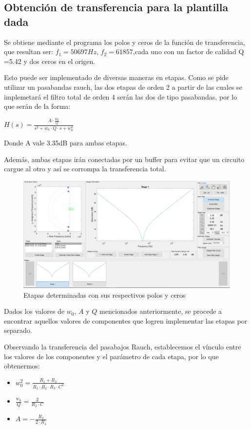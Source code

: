 \documentclass[../../tc_tp5_main.tex]{subfiles}
\begin{document}
	\subsection{Obtención de transferencia para la plantilla dada}
	
	Se obtiene mediante el programa los polos y ceros de la función de transferencia, que resultan ser: $f_1 = 50697 Hz$, $f_2 = 61857$,cada uno con un factor de calidad Q =5.42 y dos ceros en el origen.\par
	Esto puede ser implementado de diversas maneras en etapas. Como se pide utilizar un pasabandas rauch, las dos etapas de orden 2 a partir de las cuales se implemetará el filtro total de orden 4 serán las dos de tipo pasabandas, por lo que serán de la forma:
\begin{center}
$H(s) = \frac{A \cdot \frac{w_0}{Q}}{s^2 + w_0\cdot Q\cdot s + w_0^2}$
\end{center}
	\par
Donde A vale 3.35dB para ambas etapas. \par
Además, ambas etapas irán conectadas por un buffer para evitar que un circuito cargue al otro y así se corrompa la transferencia total.
		 \begin{figure}[H]	%
	\centering
	\includegraphics[scale=0.5]{imagenes/input_polos.png}
	\caption{Etapas determinadas con sus respectivos polos y ceros}
	\label{fig:ej2_input_polos}
	\end{figure}
	
 	Dados los valores de $w_0$, $A$ y $Q$ mencionados anteriormente, se procede a encontrar aquellos valores de componentes que logren implementar las etapas por separado. \par
 	Observando la transferencia del pasabajos Rauch, establecemos el vínculo entre los valores de los componentes y el parámetro de cada etapa, por lo que obtenermos: \par
 	\begin{itemize}
 		\item $w_0^2 = \frac{R_1 + R_3}{R_1\cdot R_2 \cdot R_3\cdot C^2}$
 		\item $\frac{w_0}{Q} = \frac{2}{R_2\cdot C}$
 		\item $A = -\frac{R_2}{2\cdot R_1}$
 	\end{itemize}
 	
\end{document}
